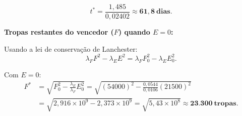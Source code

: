 \[
t^*=\frac{1{,}485}{0{,}02402}\approx\mathbf{61{,}8\ \text{dias}}.
\]

\textbf{Tropas restantes do vencedor ($F$) quando $E=0$:}

Usando a lei de conservação de Lanchester:
\[
\lambda_F F^2 - \lambda_E E^2 = \lambda_F F_0^2 - \lambda_E E_0^2.
\]

Com $E=0$:
\[
\begin{split}
F^* &= \sqrt{F_0^2 - \frac{\lambda_E}{\lambda_F}E_0^2} = \sqrt{(54000)^2 - \frac{0{,}0544}{0{,}0106}(21500)^2} \\
&= \sqrt{2{,}916\times10^9 - 2{,}373\times10^9} = \sqrt{5{,}43\times10^8}\approx\mathbf{23{.}300\ \text{tropas}}.
\end{split}
\] 